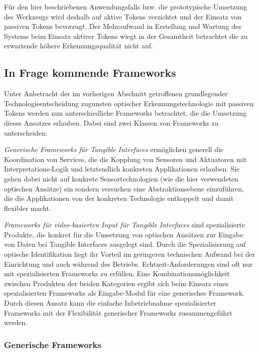 Für den hier beschriebenen Anwendungsfalls bzw. die prototypische Umsetzung des Werkzeugs wird deshalb auf aktive Tokens verzichtet und der Einsatz von passiven Tokens bevorzugt. Der Mehraufwand in Erstellung und Wartung des Systems beim Einsatz aktiver Tokens wiegt in der Gesamtheit betrachtet die zu erwartende höhere Erkennungsqualität nicht auf.

\subsection{In Frage kommende Frameworks} %
\label{sub:verfügbare_frameworks}

Unter Anbetracht der im vorherigen Abschnitt getroffenen grundlegender Technologieentscheidung zugunsten optischer Erkennungstechnologie mit passiven Tokens werden nun unterschiedliche Frameworks betrachtet, die die Umsetzung dieses Ansatzes erlauben. Dabei sind zwei Klassen von Frameworks zu unterscheiden: 

\emph{Generische Frameworks für Tangible Interfaces} ermöglichen generell die Koordination von Services, die die Kopplung von Sensoren und Aktuatoren mit Interpretations-Logik und letztendlich konkreten Applikationen erlauben. Sie gehen dabei nicht auf konkrete Sensortechnologien (wie die hier verwendeten optischen Ansätze) ein sondern versuchen eine Abstraktionsebene einzuführen, die die Applikationen von der konkreten Technologie entkoppelt und damit flexibler macht. 

\emph{Frameworks für video-basierten Input für Tangible Interfaces} sind spezialisierte Produkte, die konkret für die Umsetzung von optischen Ansätzen zur Eingabe von Daten bei Tangible Interfaces ausgelegt sind. Durch die Spezialisierung auf optische Identifikation liegt ihr Vorteil im geringeren technischen Aufwand bei der Einrichtung und auch während des Betriebs. Echtzeit-Anforderungen sind oft nur mit spezialisierten Frameworks zu erfüllen. Eine Kombinationsmöglichkeit zwischen Produkten der beiden Kategorien ergibt sich beim Einsatz eines spezialisierten Frameworks als Eingabe-Modul für eine generisches Framework. Durch diesen Ansatz kann die einfache Inbetriebnahme spezialisierter Frameworks mit der Flexibilität generischer Frameworks zusammengeführt werden. 

\subsubsection{Generische Frameworks} %
\label{ssub:generische_frameworks}

